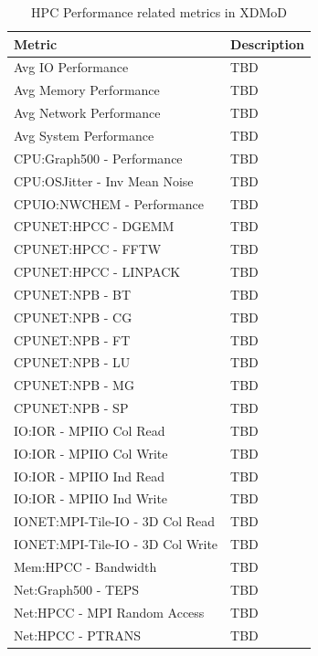\documentclass{sig-alternate-05-2015}
\begin{document}
\begin{table}[htb]
  \caption{HPC Performance related metrics in XDMoD}
\begin{scriptsize}
\label{T:xdmod23}
 \begin{tabular}{l|l} 
Metric & Description \\
\hline
Avg IO Performance & TBD \\
Avg Memory Performance & TBD \\
Avg Network Performance & TBD \\
Avg System Performance & TBD \\
CPU:Graph500 - Performance & TBD \\
CPU:OSJitter - Inv Mean Noise & TBD \\
CPUIO:NWCHEM - Performance & TBD \\
CPUNET:HPCC - DGEMM & TBD \\
CPUNET:HPCC - FFTW & TBD \\
CPUNET:HPCC - LINPACK & TBD \\
CPUNET:NPB - BT & TBD \\
CPUNET:NPB - CG & TBD \\
CPUNET:NPB - FT & TBD \\
CPUNET:NPB - LU & TBD \\
CPUNET:NPB - MG & TBD \\
CPUNET:NPB - SP & TBD \\
IO:IOR - MPIIO Col Read & TBD \\
IO:IOR - MPIIO Col Write & TBD \\
IO:IOR - MPIIO Ind Read & TBD \\
IO:IOR - MPIIO Ind Write & TBD \\
IONET:MPI-Tile-IO - 3D Col Read & TBD \\
IONET:MPI-Tile-IO - 3D Col Write & TBD \\
Mem:HPCC - Bandwidth & TBD \\
Net:Graph500 - TEPS & TBD \\
Net:HPCC - MPI Random Access & TBD \\
Net:HPCC - PTRANS & TBD \\
\hline
\end{tabular}\\
\end{scriptsize}
\end{table}
\end{document}
